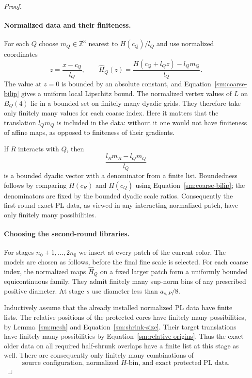 \documentclass[11pt]{article}
\numberwithin{equation}{section}
\theoremstyle{definition}
\theoremstyle{remark}
\newcommand{\Z}{\mathbb Z}
\begin{document}
\begin{proof}
\paragraph{Normalized data and their finiteness.}
For each $Q$ choose $m_Q\in\Z^3$ nearest to
$H(c_Q)/l_Q$ and use normalized coordinates
\begin{equation}
 \label{sm:normalization}
 z=\frac{x-c_Q}{l_Q},\qquad
 \widehat H_Q(z)=\frac{H(c_Q+l_Qz)-l_Qm_Q}{l_Q}.
\end{equation}
The value at $z=0$ is bounded by an absolute constant,
and Equation~\eqref{sm:coarse-bilip} gives a uniform local
Lipschitz bound.  The normalized vertex values of $L$
on $B_Q(4)$ lie in a bounded set on finitely many
dyadic grids.  They therefore take only finitely many
values for each coarse index.  Here it matters that
the translation $l_Qm_Q$ is included in the data:
without it one would not have finiteness of affine
maps, as opposed to finiteness of their gradients.

If $R$ interacts with $Q$, then
\begin{equation}
 \label{sm:relative-origins}
 \frac{l_Rm_R-l_Qm_Q}{l_Q}
\end{equation}
is a bounded dyadic vector with a denominator from a
finite list.  Boundedness follows by comparing
$H(c_R)$ and $H(c_Q)$ using Equation~\eqref{sm:coarse-bilip};
the denominators are fixed by the bounded dyadic
scale ratios.  Consequently the first-round exact
PL data, as viewed in any interacting normalized
patch, have only finitely many possibilities.

\paragraph{Choosing the second-round libraries.}
For stages $n_0+1,\ldots,2n_0$ we insert at every
patch of the current color.  The models are chosen
as follows, before the final fine scale is selected.
For each coarse index, the normalized maps
$\widehat H_Q$ on a fixed larger patch form a
uniformly bounded equicontinuous family.  They
admit finitely many sup-norm bins of any prescribed
positive diameter.  At stage $s$ use diameter less
than $a_{s,P}/8$.

Inductively assume that the already installed
normalized PL data have finite lists.  The
relative positions of the protected cores have
finitely many possibilities, by
Lemma~\ref{sm:mesh} and Equation~\eqref{sm:shrink-size}.
Their target translations have finitely many
possibilities by Equation~\eqref{sm:relative-origins}.
Thus the exact older data on all required
half-shrunk overlaps have a finite list at this
stage as well.  There are consequently only
finitely many combinations of
\begin{equation}
 \label{sm:model-combination}
 \text{source configuration, normalized }H\text{-bin,
 and exact protected PL data}.
\end{equation}


\end{proof}
\end{document}
